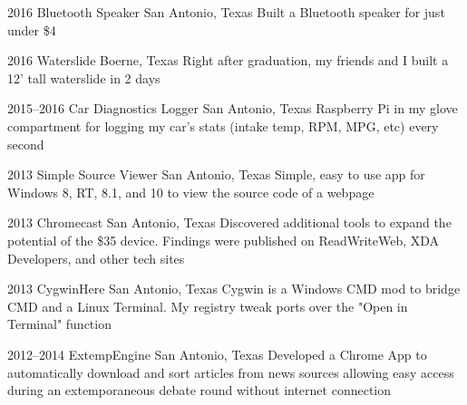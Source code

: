 \documentclass[]{friggeri-cv} %
\begin{document}
\begin{entrylist}
	\entry
	{2016}
	{Bluetooth Speaker}
	{San Antonio, Texas}
	{Built a Bluetooth speaker for just under \$4}


	\entry
	{2016}
	{Waterslide}
	{Boerne, Texas}
	{Right after graduation, my friends and I built a 12' tall waterslide in 2 days}


	\entry
	{2015--2016}
	{Car Diagnostics Logger}
	{San Antonio, Texas}
	{Raspberry Pi in my glove compartment for logging my car's stats (intake temp, RPM, MPG, etc) every  second}




	\entry
	{2013}
	{Simple Source Viewer}
	{San Antonio, Texas}
	{Simple, easy to use app for Windows 8, RT, 8.1, and 10 to view the source code of a webpage}


	\entry
	{2013}
	{Chromecast}
	{San Antonio, Texas}
	{Discovered additional tools to expand the potential of the \$35 device. Findings were published on ReadWriteWeb, XDA Developers, and other tech sites}


	\entry
	{2013}
	{CygwinHere}
	{San Antonio, Texas}
	{Cygwin is a Windows CMD mod to bridge CMD and a Linux Terminal. My registry tweak ports over the "Open in Terminal" function}


	\entry
	{2012--2014}
	{ExtempEngine}
	{San Antonio, Texas}
	{Developed a Chrome App to automatically download and sort articles from news sources allowing easy access during an extemporaneous debate round without internet connection}

\end{entrylist}

\pagebreak
\end{document}
